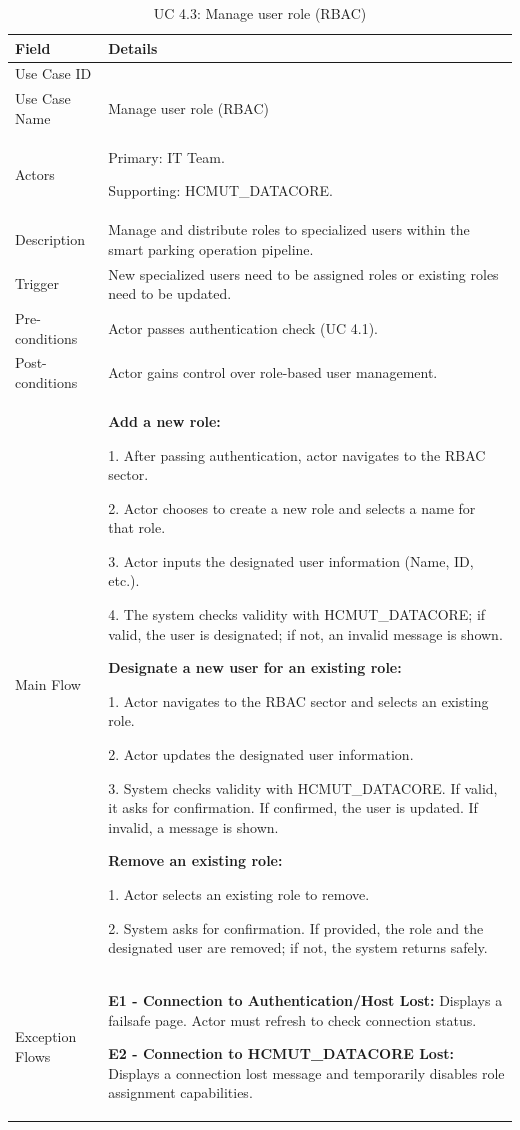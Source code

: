 \begin{table}[H]
\small
\renewcommand{\arraystretch}{1.4}
\begin{tabularx}{\textwidth}{|>{\raggedright\arraybackslash}p{3.5cm}|>{\RaggedRight\arraybackslash}X|}
\hline
\rowcolor{gray!20} \textbf{Field} & \textbf{Details} \\
\hline
Use Case ID & 4.3 \\
\hline
Use Case Name & Manage user role (RBAC) \\
\hline
Actors & Primary: IT Team. \par Supporting: HCMUT\_DATACORE. \\
\hline
Description & Manage and distribute roles to specialized users within the smart parking operation pipeline. \\
\hline
Trigger & New specialized users need to be assigned roles or existing roles need to be updated. \\
\hline
Pre-conditions & Actor passes authentication check (UC 4.1). \\
\hline
Post-conditions & Actor gains control over role-based user management. \\
\hline
Main Flow & 
\textbf{Add a new role:} \par
1. After passing authentication, actor navigates to the RBAC sector. \par
2. Actor chooses to create a new role and selects a name for that role. \par
3. Actor inputs the designated user information (Name, ID, etc.). \par
4. The system checks validity with HCMUT\_DATACORE; if valid, the user is designated; if not, an invalid message is shown. \par \vspace{0.5em}
\textbf{Designate a new user for an existing role:} \par
1. Actor navigates to the RBAC sector and selects an existing role. \par
2. Actor updates the designated user information. \par
3. System checks validity with HCMUT\_DATACORE. If valid, it asks for confirmation. If confirmed, the user is updated. If invalid, a message is shown. \par \vspace{0.5em}
\textbf{Remove an existing role:} \par
1. Actor selects an existing role to remove. \par
2. System asks for confirmation. If provided, the role and the designated user are removed; if not, the system returns safely. \\
\hline
Exception Flows & 
\textbf{E1 - Connection to Authentication/Host Lost:} Displays a failsafe page. Actor must refresh to check connection status. \par \vspace{0.5em}
\textbf{E2 - Connection to HCMUT\_DATACORE Lost:} Displays a connection lost message and temporarily disables role assignment capabilities. \\
\hline
\end{tabularx}
\caption{UC 4.3: Manage user role (RBAC)}
\label{tab:uc4.3}
\end{table}